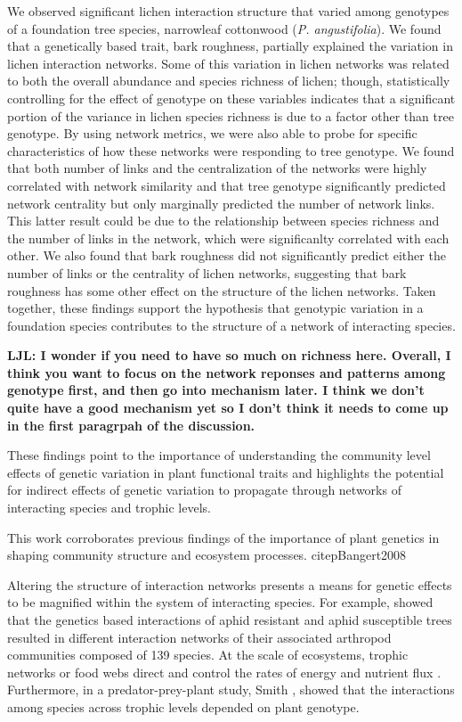 \documentclass[11pt,twocolumn,twoside,lineno]{pnas-new}
\begin{document}
We observed significant lichen interaction structure that varied among
genotypes of a foundation tree species, narrowleaf cottonwood
(\textit{P. angustifolia}). We found that a genetically based trait,
bark roughness, partially explained the variation in lichen
interaction networks. Some of this variation in lichen networks was
related to both the overall abundance and species richness of lichen;
though, statistically controlling for the effect of genotype on these
variables indicates that a significant portion of the variance in
lichen species richness is due to a factor other than tree
genotype. By using network metrics, we were also able to probe for
specific characteristics of how these networks were responding to tree
genotype. We found that both number of links and the centralization of
the networks were highly correlated with network similarity and that
tree genotype significantly predicted network centrality but only
marginally predicted the number of network links. This latter result
could be due to the relationship between species richness and the
number of links in the network, which were significanlty correlated
with each other. We also found that bark roughness did not
significantly predict either the number of links or the centrality of
lichen networks, suggesting that bark roughness has some other effect
on the structure of the lichen networks. Taken together, these
findings support the hypothesis that genotypic variation in a
foundation species contributes to the structure of a network of
interacting species.

\textbf{LJL: I wonder if you need to have so much on richness here. 
Overall, I think you want to focus on the network reponses and
patterns among genotype first, and then go into mechanism later. I
think we don’t quite have a good mechanism yet so I don’t think it
needs to come up in the first paragrpah of the discussion.}



These findings point to the importance of understanding the community
level effects of genetic variation in plant functional traits and
highlights the potential for indirect effects of genetic variation to
propagate through networks of interacting species and trophic levels.

This work corroborates previous findings of the importance of plant
genetics in shaping community structure and ecosystem
processes. citep{Bangert2008}


Altering the structure of interaction networks presents a means for
genetic effects to be magnified within the system of interacting
species. For example, \citep{Keith2017} showed that the genetics based
interactions of aphid resistant and aphid susceptible trees resulted
in different interaction networks of their associated arthropod
communities composed of 139 species. At the scale of ecosystems,
trophic networks or food webs direct and control the rates of energy
and nutrient flux \cite{Borgatti2006}. Furthermore, in a
predator-prey-plant study, Smith \cite{Smith2011}, showed that the
interactions among species across trophic levels depended on plant
genotype.
\end{document}
